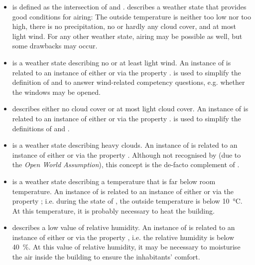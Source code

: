 \begin{itemize}
  \item {} is defined as the intersection of  and .  describes a weather state that provides good conditions for airing: The outside temperature is neither too low nor too high, there is no precipitation, no or hardly any cloud cover, and at most light wind. For any other weather state, airing may be possible as well, but some drawbacks may occur.
  
  \item {} is a weather state describing no or at least light wind. An instance of  is related to an instance of either  or  via the property .  is used to simplify the definition of  and to answer wind-related competency questions, e.g. whether the windows may be opened.
  
  \item {} describes either no cloud cover or at most light cloud cover. An instance of  is related to an instance of either  or  via the property .  is used to simplify the definitions of  and .
  
  \item {} is a weather state describing heavy clouds. An instance of  is related to an instance of either  or  via the property . Although not recognised by  (due to the \emph{Open World Assumption}), this concept is the de-facto complement of .
  
  \item {} is a weather state describing a temperature that is far below room temperature. An instance of  is related to an instance of either  or  via the property ; i.e. during the state of , the outside temperature is below \SI{10}{\celsius}. At this temperature, it is probably necessary to heat the building.
  
  \item {} describes a low value of relative humidity. An instance of  is related to an instance of either  or  via the property , i.e. the relative humidity is below \SI{40}{\percent}. At this value of relative humidity, it may be necessary to moisturise the air inside the building to ensure the inhabitants' comfort.
  

\end{itemize}
